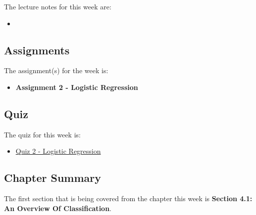 \noindent The lecture notes for this week are:

\begin{itemize}
    \item {}
\end{itemize}

\subsection{Assignments}

The assignment(s) for the week is:

\begin{itemize}
    \item \textbf{Assignment 2 - Logistic Regression}
\end{itemize}

\subsection{Quiz}

The quiz for this week is:

\begin{itemize}
    \item \href{https://applied.cs.colorado.edu/mod/quiz/view.php?id=67076}{Quiz 2 - Logistic Regression}
\end{itemize}

\newpage

\subsection{Chapter Summary}

The first section that is being covered from the chapter this week is \textbf{Section 4.1: An Overview Of Classification}. 


